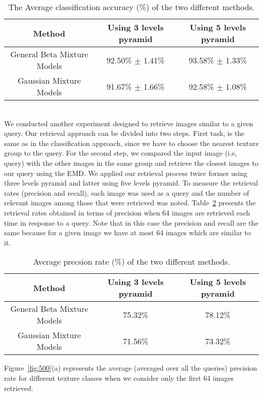 \documentclass[journal,10pt]{elsart}
\begin{document}
\begin{table}[ht!]
\begin{center}
\caption{The Average classification accuracy (\%) of the two different methods.\label{tab4}}
\small
\begin{tabular}{|c c c|}
  \hline
Method &Using 3 levels pyramid&Using 5 levels pyramid\\\hline
General Beta Mixture Models&92.50\% $\pm$ 1.41\%&93.58\% $\pm$ 1.33\%\\
Gaussian Mixture Models&91.67\% $\pm$ 1.66\%&92.58\% $\pm$ 1.08\%\\
  \hline
\end{tabular}
\end{center}
\end{table}
\\We conducted another experiment designed to retrieve images similar to a given query.
Our retrieval approach can be divided into two steps.
First task, is the same as in the classification approach, since
we have to choose the nearest texture group to the query.
For the second step, we compared the input image (i.e, query) with the other images in the same group and retrieve the closest images to our query
using the EMD.
We applied our retrieval process twice former using three levels pyramid and latter using five levels pyramid. To measure the retrieval
rates (precision and recall), each image was used as a query and the number of relevant images among those that were retrieved
was noted. Table~\ref{tab5} presents the retrieval rates obtained in terms of precision when 64 images are retrieved each time in response to a query.
Note that in this case the precision and recall are the same
because for a given image we have
at most 64 images which are similar to it.
\begin{table}[ht!]
\begin{center}
\caption{Average precsion rate (\%) of the two different methods.\label{tab5}}
\small
\begin{tabular}{|c c c|}
  \hline
Method &Using 3 levels pyramid&Using 5 levels pyramid\\\hline
General Beta Mixture Models&75.32\%&78.12\%\\
Gaussian Mixture Models&71.56\%&73.32\%\\
  \hline
\end{tabular}
\end{center}
\end{table}
Figure~\ref{fig:500}(a) represents the average (averaged over all the
queries) precision rate for different texture classes when we consider only the first 64 images retrieved.
\end{document}
